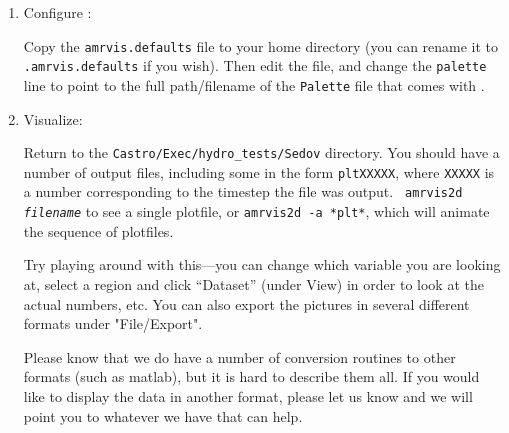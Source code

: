 \begin{enumerate}
\item Configure \amrvis:  

  Copy the {\tt amrvis.defaults} file to your home directory (you can
  rename it to {\tt .amrvis.defaults} if you wish).  Then edit the
  file, and change the {\tt palette} line to point to the full
  path/filename of the {\tt Palette} file that comes with \amrvis.

\item Visualize:

  Return to the {\tt Castro/Exec/hydro\_tests/Sedov} directory.  You should
  have a number of output files, including some in the form {\tt *pltXXXXX},
  where {\tt XXXXX} is a number corresponding to the timestep the file
  was output.  {\tt
    amrvis2d {\em filename}} to see a single plotfile, or {\tt amrvis2d -a
  *plt*}, which will animate the sequence of plotfiles.

  Try playing
  around with this---you can change which variable you are
  looking at, select a region and click ``Dataset'' (under View)
  in order to look at the actual numbers, etc. You can also export the
  pictures in several different formats under "File/Export".

Please know that we do have a number of conversion routines to other
formats (such as matlab), but it is hard to describe them all. If you
would like to display the data in another format, please let us know
and we will point you to whatever we have that can help.

\end{enumerate}
